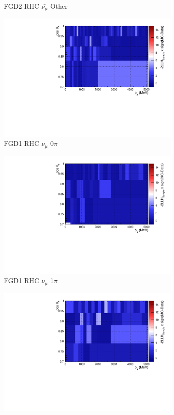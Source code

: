 \begin{figure}[!htbp]
\begin{subfigure}{.32\textwidth}
  \caption{FGD2 RHC $\bar{\nu_{\mu}}$ Other}
  \label{fig:llhcont_FGD2_anti-numuCC_other}
\end{subfigure}
\begin{subfigure}{.32\textwidth}
  \centering
  \includegraphics[width=0.85\linewidth]{figs/llhcont_Poly574_FGD1_NuMuBkg_CC0pi_in_AntiNu_Mode.pdf}
  \caption{FGD1 RHC $\nu_{\mu}$ 0$\pi$}
  \label{fig:llhcont_FGD1_NuMuBkg_CC0pi_in_AntiNu_Mode}
\end{subfigure}
\begin{subfigure}{.32\textwidth}
  \centering
  \includegraphics[width=0.85\linewidth]{figs/llhcont_Poly574_FGD1_NuMuBkg_CC1pi_in_AntiNu_Mode.pdf}
  \caption{FGD1 RHC $\nu_{\mu}$ 1$\pi$}
  \label{fig:llhcont_FGD1_NuMuBkg_CC1pi_in_AntiNu_Mode}
\end{subfigure}
\begin{subfigure}{.32\textwidth}
  \centering
  \includegraphics[width=0.85\linewidth]{figs/llhcont_Poly574_FGD1_NuMuBkg_CCOther_in_AntiNu_Mode.pdf}

\end{subfigure}
\end{figure}
